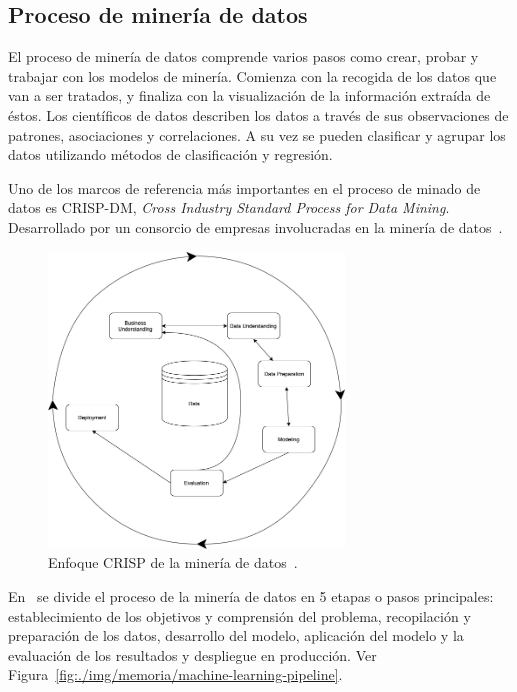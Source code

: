 \subsection{Proceso de minería de datos}
El proceso de minería de datos comprende varios pasos como crear, probar y trabajar con los modelos de minería. Comienza con la recogida de los datos que van a ser tratados, y finaliza con la visualización de la información extraída de éstos. 
Los científicos de datos describen los datos a través de sus observaciones de patrones, asociaciones y correlaciones. A su vez se pueden clasificar y agrupar los datos utilizando métodos de clasificación y regresión.

Uno de los marcos de referencia más importantes en el proceso de minado de datos es CRISP-DM, \textit{Cross Industry Standard Process for Data Mining}. Desarrollado por un consorcio de empresas involucradas en la minería de datos~\cite{Chapman2000CRISPDM1S}.

\begin{figure}
\centering
\includegraphics[width=0.7\textwidth]{./img/memoria/CRISP-DM}
\caption{Enfoque CRISP de la minería de datos~\cite{KOTU201517}.}
\label{./img/memoria/CRISP-DM}
\end{figure}

En~\cite{KOTU201517} se divide el proceso de la minería de datos en 5 etapas o pasos principales: establecimiento de los objetivos y comprensión del problema, recopilación y preparación de los datos, desarrollo del modelo, aplicación del modelo y la evaluación de los resultados y despliegue en producción. Ver Figura~\ref{fig:./img/memoria/machine-learning-pipeline}.

